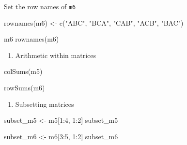\documentclass[
  letterpaper,
  DIV=11,
  numbers=noendperiod]{scrreprt}
\newenvironment{Shaded}{}{}
\newcommand{\DecValTok}[1]{\textcolor[rgb]{0.00,0.36,0.77}{#1}}
\newcommand{\FunctionTok}[1]{\textcolor[rgb]{0.44,0.26,0.76}{#1}}
\newcommand{\NormalTok}[1]{\textcolor[rgb]{0.14,0.16,0.18}{#1}}
\newcommand{\OtherTok}[1]{\textcolor[rgb]{0.44,0.26,0.76}{#1}}
\newcommand{\SpecialCharTok}[1]{\textcolor[rgb]{0.00,0.36,0.77}{#1}}
\newcommand{\StringTok}[1]{\textcolor[rgb]{0.01,0.18,0.38}{#1}}
\providecommand{\tightlist}{%
  \setlength{\itemsep}{0pt}\setlength{\parskip}{0pt}}\usepackage{longtable,booktabs,array}
\begin{document}
Set the row names of \texttt{m6}

\begin{Shaded}
\begin{Highlighting}[]
\FunctionTok{rownames}\NormalTok{(m6) }\OtherTok{\textless{}{-}} \FunctionTok{c}\NormalTok{(}\StringTok{"ABC"}\NormalTok{, }\StringTok{"BCA"}\NormalTok{, }\StringTok{"CAB"}\NormalTok{, }\StringTok{"ACB"}\NormalTok{, }\StringTok{"BAC"}\NormalTok{)}
\end{Highlighting}
\end{Shaded}

\begin{Shaded}
\begin{Highlighting}[]
\NormalTok{m6}
\FunctionTok{rownames}\NormalTok{(m6)}
\end{Highlighting}
\end{Shaded}

\begin{enumerate}
\def\labelenumi{\alph{enumi}.}
\setcounter{enumi}{6}
\tightlist
\item
  Arithmetic within matrices
\end{enumerate}

\begin{Shaded}
\begin{Highlighting}[]
\FunctionTok{colSums}\NormalTok{(m5)}
\end{Highlighting}
\end{Shaded}

\begin{Shaded}
\begin{Highlighting}[]
\FunctionTok{rowSums}\NormalTok{(m6)}
\end{Highlighting}
\end{Shaded}

\begin{enumerate}
\def\labelenumi{\alph{enumi}.}
\setcounter{enumi}{7}
\tightlist
\item
  Subsetting matrices
\end{enumerate}

\begin{Shaded}
\begin{Highlighting}[]
\NormalTok{subset\_m5 }\OtherTok{\textless{}{-}}\NormalTok{ m5[}\DecValTok{1}\SpecialCharTok{:}\DecValTok{4}\NormalTok{, }\DecValTok{1}\SpecialCharTok{:}\DecValTok{2}\NormalTok{]}
\NormalTok{subset\_m5}
\end{Highlighting}
\end{Shaded}

\begin{Shaded}
\begin{Highlighting}[]
\NormalTok{subset\_m6 }\OtherTok{\textless{}{-}}\NormalTok{ m6[}\DecValTok{3}\SpecialCharTok{:}\DecValTok{5}\NormalTok{, }\DecValTok{1}\SpecialCharTok{:}\DecValTok{2}\NormalTok{]}
\NormalTok{subset\_m6}
\end{Highlighting}
\end{Shaded}
\end{document}
